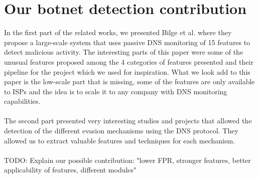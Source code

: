 \section{Our botnet detection contribution}
In the first part of the related works, we presented Bilge et al. \cite{exposure} where they propose a large-scale system that uses passive DNS monitoring of 15 features to detect malicious activity. The interesting parts of this paper were some of the unusual features proposed among the 4 categories of features presented and their pipeline for the project which we used for inspiration. What we look add to this paper is the low-scale part that is missing, some of the features are only available to ISPs and the idea is to scale it to any company with DNS monitoring capabilities.\\
\\
The second part presented very interesting studies and projects that allowed the detection of the different evasion mechanisms using the DNS protocol. They allowed us to extract valuable features and techniques for each mechanism. \\
\\ 
TODO: Explain our possible contribution: 
"lower FPR, stronger features, better applicability of features, different modules"